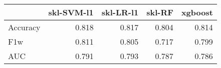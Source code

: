 \begin{tabular}{lrrrr}
\toprule
{} &  skl-SVM-l1 &  skl-LR-l1 &  skl-RF &  xgboost \\
\midrule
Accuracy &       0.818 &      0.817 &   0.804 &    0.814 \\
F1w      &       0.811 &      0.805 &   0.717 &    0.799 \\
AUC      &       0.791 &      0.793 &   0.787 &    0.786 \\
\bottomrule
\end{tabular}
